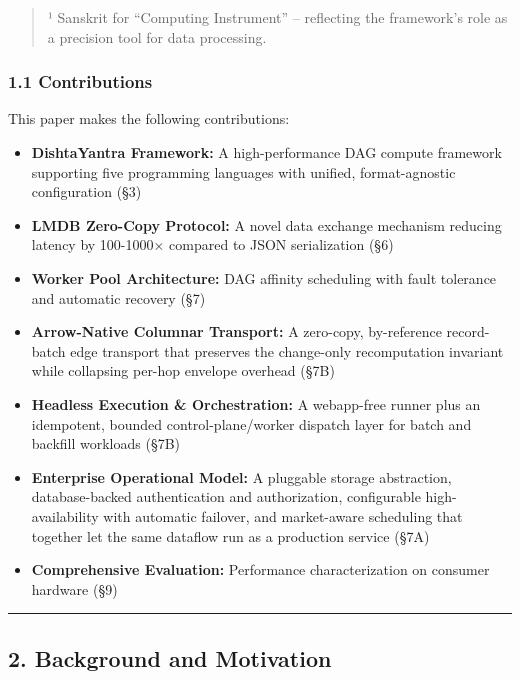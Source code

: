 \documentclass[
]{article}
\providecommand{\tightlist}{%
  \setlength{\itemsep}{0pt}\setlength{\parskip}{0pt}}
\begin{document}
\begin{quote}
¹ Sanskrit for ``Computing Instrument'' -- reflecting the framework's
role as a precision tool for data processing.
\end{quote}

\hypertarget{contributions}{%
\subsubsection{1.1 Contributions}\label{contributions}}

This paper makes the following contributions:

\begin{itemize}
\tightlist
\item
  \textbf{DishtaYantra Framework:} A high-performance DAG compute
  framework supporting five programming languages with unified,
  format-agnostic configuration (§3)
\item
  \textbf{LMDB Zero-Copy Protocol:} A novel data exchange mechanism
  reducing latency by 100-1000× compared to JSON serialization (§6)
\item
  \textbf{Worker Pool Architecture:} DAG affinity scheduling with fault
  tolerance and automatic recovery (§7)
\item
  \textbf{Arrow-Native Columnar Transport:} A zero-copy, by-reference
  record-batch edge transport that preserves the change-only
  recomputation invariant while collapsing per-hop envelope overhead
  (§7B)
\item
  \textbf{Headless Execution \& Orchestration:} A webapp-free runner
  plus an idempotent, bounded control-plane/worker dispatch layer for
  batch and backfill workloads (§7B)
\item
  \textbf{Enterprise Operational Model:} A pluggable storage
  abstraction, database-backed authentication and authorization,
  configurable high-availability with automatic failover, and
  market-aware scheduling that together let the same dataflow run as a
  production service (§7A)
\item
  \textbf{Comprehensive Evaluation:} Performance characterization on
  consumer hardware (§9)
\end{itemize}

\begin{center}\rule{0.5\linewidth}{0.5pt}\end{center}

\hypertarget{background-and-motivation}{%
\subsection{2. Background and
Motivation}\label{background-and-motivation}}
\end{document}
